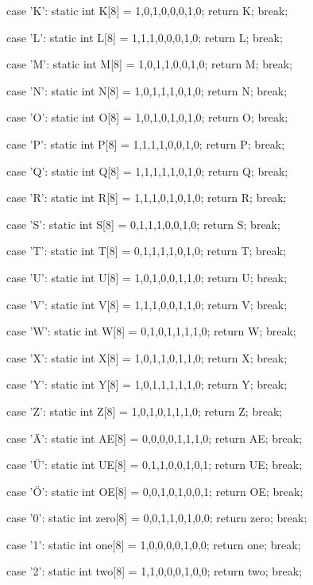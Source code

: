 {{    case 'K':
    static int K[8] = {1,0,1,0,0,0,1,0};
    return K;
    break;

    case 'L':
    static int L[8] = {1,1,1,0,0,0,1,0};
    return L;
    break;

    case 'M':
    static int M[8] = {1,0,1,1,0,0,1,0};
    return M;
    break;

    case 'N':
    static int N[8] = {1,0,1,1,1,0,1,0};
    return N;
    break;
    
    case 'O':
    static int O[8] = {1,0,1,0,1,0,1,0};
    return O;
    break;

    case 'P':
    static int P[8] = {1,1,1,1,0,0,1,0};
    return P;
    break;

    case 'Q':
    static int Q[8] = {1,1,1,1,1,0,1,0};
    return Q;
    break;

    case 'R':
    static int R[8] = {1,1,1,0,1,0,1,0};
    return R;
    break;

    case 'S':
    static int S[8] = {0,1,1,1,0,0,1,0};
    return S;
    break;

    case 'T':
    static int T[8] = {0,1,1,1,1,0,1,0};
    return T;
    break;

    case 'U':
    static int U[8] = {1,0,1,0,0,1,1,0};
    return U;
    break;

    case 'V':
    static int V[8] = {1,1,1,0,0,1,1,0};
    return V;
    break;

    case 'W':
    static int W[8] = {0,1,0,1,1,1,1,0};
    return W;
    break;

    case 'X':
    static int X[8] = {1,0,1,1,0,1,1,0};
    return X;
    break;

    case 'Y':
    static int Y[8] = {1,0,1,1,1,1,1,0};
    return Y;
    break;

    case 'Z':
    static int Z[8] = {1,0,1,0,1,1,1,0};
    return Z;
    break;
  
    case 'Ä':
    static int AE[8] = {0,0,0,0,1,1,1,0};
    return AE;
    break;

    case 'Ü':
    static int UE[8] = {0,1,1,0,0,1,0,1};
    return UE;
    break;

    case 'Ö':
    static int OE[8] = {0,0,1,0,1,0,0,1};
    return OE;
    break;

    case '0':
    static int zero[8] = {0,0,1,1,0,1,0,0};
    return zero;
    break;
  
    case '1':
    static int one[8] = {1,0,0,0,0,1,0,0};
    return one;
    break;
  
    case '2':
    static int two[8] = {1,1,0,0,0,1,0,0};
    return two;
    break;
  
}}
